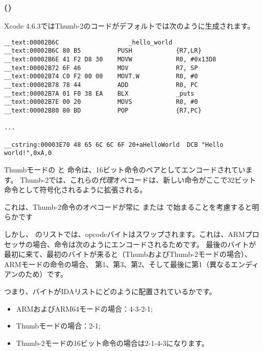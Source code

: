 \subsubsection{\OptimizingXcodeIV (\ThumbTwoMode)}

Xcode 4.6.3ではThumb-2のコードがデフォルトでは次のように生成されます。

\begin{lstlisting}[caption=\OptimizingXcodeIV (\ThumbTwoMode),style=customasmARM]
__text:00002B6C                   _hello_world
__text:00002B6C 80 B5          PUSH            {R7,LR}
__text:00002B6E 41 F2 D8 30    MOVW            R0, #0x13D8
__text:00002B72 6F 46          MOV             R7, SP
__text:00002B74 C0 F2 00 00    MOVT.W          R0, #0
__text:00002B78 78 44          ADD             R0, PC
__text:00002B7A 01 F0 38 EA    BLX             _puts
__text:00002B7E 00 20          MOVS            R0, #0
__text:00002B80 80 BD          POP             {R7,PC}

...

__cstring:00003E70 48 65 6C 6C 6F 20+aHelloWorld  DCB "Hello world!",0xA,0
\end{lstlisting}


\myindex{\ThumbTwoMode}

Thumbモードの と 命令は、16ビット命令のペアとしてエンコードされています。 
Thumb-2では、これらの\emph{代理}オペコードは、新しい命令がここで32ビット命令として符号化されるように拡張される。

これは、Thumb-2命令のオペコードが常に または で始まることを考慮すると明らかです

しかし、 \IDA のリストでは、opcodeバイトはスワップされます。これは、ARMプロセッサの場合、命令は次のようにエンコードされるためです。
最後のバイトが最初に来て、最初のバイトが来ると（ThumbおよびThumb-2モードの場合）、
ARMモードの命令の場合、 第1、第3、第2、そして最後に第1（異なるエンディアンのため）です。

つまり、バイトがIDAリストにどのように配置されているかです。

\begin{itemize}
\item ARMおよびARM64モードの場合：4-3-2-1;
\item Thumbモードの場合：2-1;
\item Thumb-2モードの16ビット命令の場合は2-1-4-3になります。
\end{itemize}

